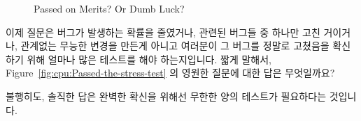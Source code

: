 \begin{figure}[tb]
\centering
{}
\caption{Passed on Merits?  Or Dumb Luck?}
\end{figure}

이제 질문은 버그가 발생하는 확률을 줄였거나, 관련된 버그들 중 하나만 고친
거이거나, 관계없는 무능한 변경을 만든게 아니고 여러분이 그 버그를 정말로
고쳤음을 확신하기 위해 얼마나 많은 테스트를 해야 하는지입니다.
짧게 말해서,
Figure~\ref{fig:cpu:Passed-the-stress-test} 의 영원한 질문에 대한 답은
무엇일까요?

불행히도, 솔직한 답은 완벽한 확신을 위해선 무한한 양의 테스트가 필요하다는
것입니다.

